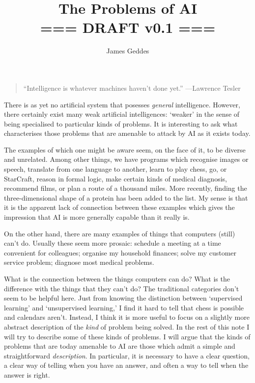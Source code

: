 \documentclass[10pt, a4, twocolumn]{article}
\title{The Problems of AI \\ === DRAFT v0.1 ===}
\author{James Geddes}
\begin{document}
\maketitle
\thispagestyle{empty}\pagestyle{empty}
\begin{quote}
``Intelligence is whatever machines haven't done yet.'' ---Lawrence Tesler
\end{quote}
There is as yet no artificial system that posesses \emph{general}
intelligence. However, there certainly exist many weak artificial intelligences:
`weaker' in the sense of being specialised to particular kinds of problems. It
is interesting to ask what characterises those problems that are amenable to
attack by AI as it exists today.

The examples of which one might be aware seem, on the face of it, to be diverse
and unrelated. Among other things, we have programs which recognise images or
speech, translate from one language to another, learn to play chess, go, or
StarCraft, reason in formal logic, make certain kinds of medical diagnosis,
recommend films, or plan a route of a thousand miles. More recently, finding the
three-dimensional shape of a protein has been added to the list. My sense is
that it is the apparent lack of connection between these examples which gives
the impression that AI is more generally capable than it really is.

On the other hand, there are many examples of things that computers (still)
can't do. Usually these seem more prosaic: schedule a meeting at a time
convenient for colleagues; organise my household finances; solve my customer
service problem; diagnose most medical problems.

What is the connection between the things computers can do? What is the
difference with the things that they can't do? The traditional categories don't
seem to be helpful here. Just from knowing the distinction between `supervised
learning' and `unsupervised learning,' I find it hard to tell that chess is
possible and calendars aren't. Instead, I think it is more useful to focus on a
slightly more abstract description of the \emph{kind} of problem being
solved. In the rest of this note I will try to describe some of these kinds of
problems. I will argue that the kinds of problems that are today amenable to AI
are those which admit a simple and straightforward \emph{description}. In
particular, it is necessary to have a clear question, a clear way of telling
when you have an answer, and often a way to tell when the answer is right. 
\end{document}
